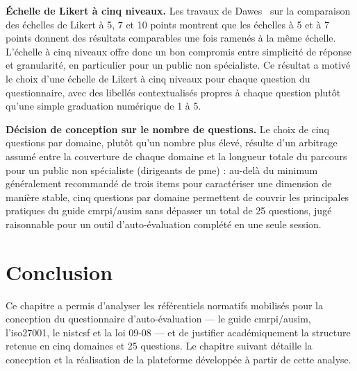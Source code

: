 \textbf{Échelle de Likert à cinq niveaux.} Les travaux de Dawes~\cite{dawes2008} sur la comparaison des échelles de Likert à 5, 7 et 10 points montrent que les échelles à 5 et à 7 points donnent des résultats comparables une fois ramenés à la même échelle. L'échelle à cinq niveaux offre donc un bon compromis entre simplicité de réponse et granularité, en particulier pour un public non spécialiste. Ce résultat a motivé le choix d'une échelle de Likert à cinq niveaux pour chaque question du questionnaire, avec des libellés contextualisés propres à chaque question plutôt qu'une simple graduation numérique de 1 à 5.

\textbf{Décision de conception sur le nombre de questions.} Le choix de cinq questions par domaine, plutôt qu'un nombre plus élevé, résulte d'un arbitrage assumé entre la couverture de chaque domaine et la longueur totale du parcours pour un public non spécialiste (dirigeants de \gls{pme}) : au-delà du minimum généralement recommandé de trois items pour caractériser une dimension de manière stable, cinq questions par domaine permettent de couvrir les principales pratiques du guide \gls{cmrpi}/\gls{ausim} sans dépasser un total de 25 questions, jugé raisonnable pour un outil d'auto-évaluation complété en une seule session.


\section*{Conclusion}

Ce chapitre a permis d'analyser les référentiels normatifs mobilisés pour la conception du questionnaire d'auto-évaluation --- le guide \gls{cmrpi}/\gls{ausim}, l'\gls{iso27001}, le \gls{nistcsf} et la loi 09-08 --- et de justifier académiquement la structure retenue en cinq domaines et 25 questions. Le chapitre suivant détaille la conception et la réalisation de la plateforme développée à partir de cette analyse.

